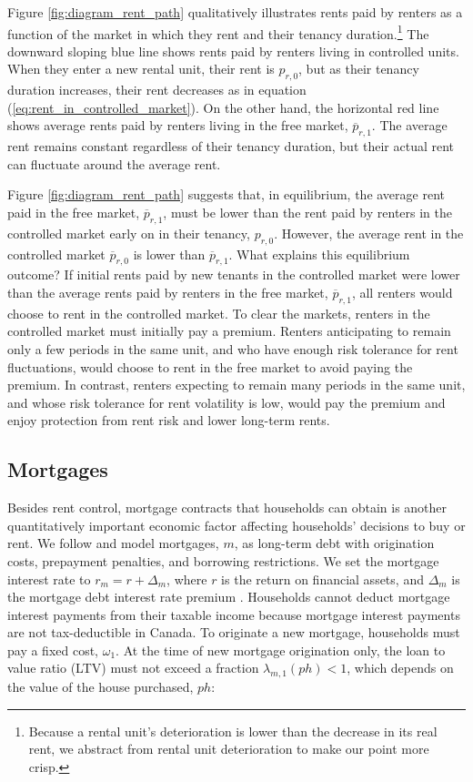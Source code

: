 \documentclass[parskip=full]{article}
\begin{document}
Figure \ref{fig:diagram_rent_path} qualitatively illustrates rents paid by renters as a function of the market in which they rent and their tenancy duration.\footnote{Because a rental unit's deterioration is lower than the decrease in its real rent, we abstract from rental unit deterioration to make our point more crisp.} The downward sloping blue line shows rents paid by renters living in controlled units. When they enter a new rental unit, their rent is $p_{r,0}$, but as their tenancy duration increases, their rent decreases as in equation (\ref{eq:rent_in_controlled_market}). On the other hand, the horizontal red line shows average rents paid by renters living in the free market, $\overline{p}_{r,1}$. The average rent remains constant regardless of their tenancy duration, but their actual rent can fluctuate around the average rent. 

Figure \ref{fig:diagram_rent_path} suggests that, in equilibrium, the average rent paid in the free market, $\overline{p}_{r,1}$, must be lower than the rent paid by renters in the controlled market early on in their tenancy, $p_{r,0}$. However, the average rent in the controlled market $\overline{p}_{r,0}$ is lower than $\overline{p}_{r,1}$. What explains this equilibrium outcome? If initial rents paid by new tenants in the controlled market were lower than the average rents paid by renters in the free market, $\overline{p}_{r,1}$, all renters would choose to rent in the controlled market. To clear the markets, renters in the controlled market must initially pay a premium. Renters anticipating to remain only a few periods in the same unit, and who have enough risk tolerance for rent fluctuations, would choose to rent in the free market to avoid paying the premium. In contrast, renters expecting to remain many periods in the same unit, and whose risk tolerance for rent volatility is low, would pay the premium and enjoy protection from rent risk and lower long-term rents.

\subsection{Mortgages}\label{subsection:morgtages}

Besides rent control, mortgage contracts that households can obtain is another quantitatively important economic factor affecting households' decisions to buy or rent. We follow \citet{rs-2023} and model mortgages, $m$, as long-term debt with origination costs, prepayment penalties, and borrowing restrictions. We set the mortgage interest rate to $r_{m}=r+\Delta_m$, where $r$ is the return on financial assets, and $\Delta_m$ is the mortgage debt interest rate premium \citep{sommeretal-2013,sommersullivan-2017,kaplanetal-2019}. Households cannot deduct mortgage interest payments from their taxable income because mortgage interest payments are not tax-deductible in Canada. To originate a new mortgage, households must pay a fixed cost, $\omega_{1}$. At the time of new mortgage origination only, the loan to value ratio (LTV) must not exceed a fraction $\lambda_{m,1}(ph)<1$, which depends on the value of the house purchased, $ph$:
\end{document}
